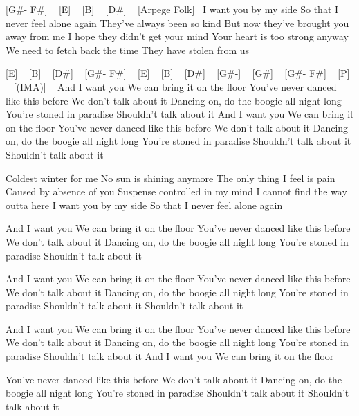 [G#- F#] ~  [E] ~ [B] ~ [D#] ~
[Arpege Folk]~
I want you by my side
So that I never feel alone again
They've always been so kind
But now they've brought you away from me
I hope they didn't get your mind
Your heart is too strong anyway
We need to fetch back the time
They have stolen from us

[E] ~ [B] ~ [D#] ~ [G#- F#] ~
[E] ~ [B] ~ [D#] ~ [G#-] ~
[G#] ~ [G#- F#] ~
[P] ~ [(IMA)] ~
And I want you
We can bring it on the floor
You've never danced like this before
We don't talk about it
Dancing on, do the boogie all night long
You're stoned in paradise
Shouldn't talk about it
And I want you
We can bring it on the floor
You've never danced like this before
We don't talk about it
Dancing on, do the boogie all night long
You're stoned in paradise
Shouldn't talk about it
Shouldn't talk about it

Coldest winter for me
No sun is shining anymore
The only thing I feel is pain
Caused by absence of you
Suspense controlled in my mind
I cannot find the way outta here
I want you by my side
So that I never feel alone again

And I want you
We can bring it on the floor
You've never danced like this before
We don't talk about it
Dancing on, do the boogie all night long
You're stoned in paradise
Shouldn't talk about it

And I want you
We can bring it on the floor
You've never danced like this before
We don't talk about it
Dancing on, do the boogie all night long
You're stoned in paradise
Shouldn't talk about it
Shouldn't talk about it

And I want you
We can bring it on the floor
You've never danced like this before
We don't talk about it
Dancing on, do the boogie all night long
You're stoned in paradise
Shouldn't talk about it
And I want you
We can bring it on the floor

You've never danced like this before
We don't talk about it
Dancing on, do the boogie all night long
You're stoned in paradise
Shouldn't talk about it
Shouldn't talk about it
